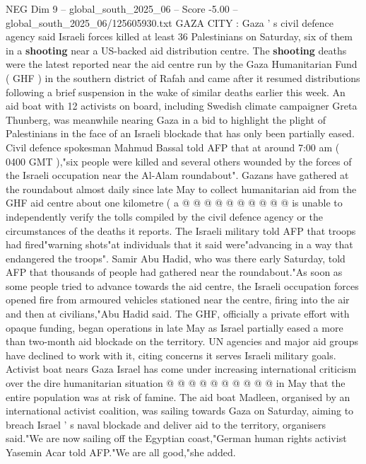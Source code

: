 \begin{textsample}{NEG Dim 9 – global\_south\_2025\_06 – Score -5.00 – global\_south\_2025\_06/125605930.txt}  \label{ex:f9_neg_255}
GAZA CITY : Gaza ' s civil defence agency said Israeli forces killed at least 36 Palestinians on Saturday, six of them in a \textbf{shooting} near a US-backed aid distribution centre.
The \textbf{shooting} deaths were the latest reported near the aid centre run by the Gaza Humanitarian Fund ( GHF ) in the southern district of Rafah and came after it resumed distributions following a brief suspension in the wake of similar deaths earlier this week.
An aid boat with 12 activists on board, including Swedish climate campaigner Greta Thunberg, was meanwhile nearing Gaza in a bid to highlight the plight of Palestinians in the face of an Israeli blockade that has only been partially eased.
Civil defence spokesman Mahmud Bassal told AFP that at around 7:00 am ( 0400 GMT ),"six people were killed and several others wounded by the forces of the Israeli occupation near the Al-Alam roundabout".
Gazans have gathered at the roundabout almost daily since late May to collect humanitarian aid from the GHF aid centre about one kilometre ( a @ @ @ @ @ @ @ @ @ @ is unable to independently verify the tolls compiled by the civil defence agency or the circumstances of the deaths it reports.
The Israeli military told AFP that troops had fired"warning shots"at individuals that it said were"advancing in a way that endangered the troops".
Samir Abu Hadid, who was there early Saturday, told AFP that thousands of people had gathered near the roundabout."As soon as some people tried to advance towards the aid centre, the Israeli occupation forces opened fire from armoured vehicles stationed near the centre, firing into the air and then at civilians,"Abu Hadid said.
The GHF, officially a private effort with opaque funding, began operations in late May as Israel partially eased a more than two-month aid blockade on the territory.
UN agencies and major aid groups have declined to work with it, citing concerns it serves Israeli military goals.
Activist boat nears Gaza Israel has come under increasing international criticism over the dire humanitarian situation @ @ @ @ @ @ @ @ @ @ in May that the entire population was at risk of famine.
The aid boat Madleen, organised by an international activist coalition, was sailing towards Gaza on Saturday, aiming to breach Israel ' s naval blockade and deliver aid to the territory, organisers said."We are now sailing off the Egyptian coast,"German human rights activist Yasemin Acar told AFP."We are all good,"she added.

\end{textsample}
